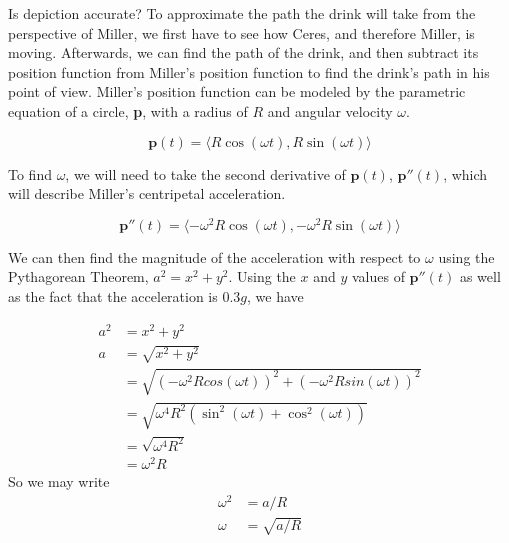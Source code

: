 \documentclass{amsart}
\renewcommand{\vec}{\textbf}
\theoremstyle{definition}
\begin{document}
\hrulefill %

Is depiction accurate? To approximate the path the drink will take from the perspective of Miller, we first have to see how Ceres, and therefore Miller, is moving. Afterwards, we can find the path of the drink, and then subtract its position function from Miller's position function to find the drink's path in his point of view. Miller's position function can be modeled by the parametric equation of a circle, \vec{p}, with a radius of $R$ and angular velocity $\omega$.

\[
\vec{p}(t) = \langle R\cos(\omega t),R \sin(\omega t)\rangle
\]


To find $\omega$, we will need to take the second derivative of $\vec{p}(t)$, $\vec{p}''(t)$, which will describe Miller's centripetal acceleration.

\[
\vec{p}''(t) = \langle -\omega^2 R \cos(\omega t), - \omega^2 R \sin(\omega t)\rangle
\]

We can then find the magnitude of the acceleration with respect to $\omega$ using the Pythagorean Theorem, $a^2 = x^2 + y^2$. Using the $x$ and $y$ values of $\vec{p}''(t)$ as well as the fact that the acceleration is $0.3g$, we have

\begin{align*}
    a^2 &= x^2 + y^2 \\
    a &= \sqrt{x^2 + y^2} \\
    &= \sqrt{(-\omega^2 R cos(\omega t))^2 + (- \omega^2 R sin(\omega t))^2} \\
    &= \sqrt{\omega^4 R^2 (\sin^2(\omega t) + \cos^2(\omega t))} \\
    &= \sqrt{\omega^4 R^2} \\
    &= \omega^2 R
    \end{align*}
    So we may write
\begin{align*}
    \omega^2 &= a / R\\
    \omega &= \sqrt{a/R}
\end{align*}
\end{document}
